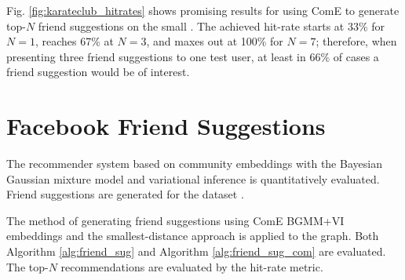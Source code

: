 \documentclass[conference]{IEEEtran}
\begin{document}
Fig. \ref{fig:karateclub_hitrates} shows promising results for using ComE to generate top-$N$ friend suggestions on the small . The achieved hit-rate starts at 33\% for $N=1$, reaches 67\% at $N=3$, and maxes out at 100\% for $N=7$; therefore, when presenting three friend suggestions to one test user, at least in $66\%$ of cases a friend suggestion would be of interest.


\section{Facebook Friend Suggestions}

The recommender system based on community embeddings with the Bayesian Gaussian mixture model and variational inference is quantitatively evaluated. Friend suggestions are generated for the  dataset \cite{social_circles_fb, social_circles_in_ego_networks}.

The method of generating friend suggestions using ComE BGMM+VI embeddings and the smallest-distance approach is applied to the  graph. Both Algorithm \ref{alg:friend_sug} and Algorithm \ref{alg:friend_sug_com} are evaluated. The top-$N$ recommendations are evaluated by the hit-rate metric.



\printbibliography
\end{document}
